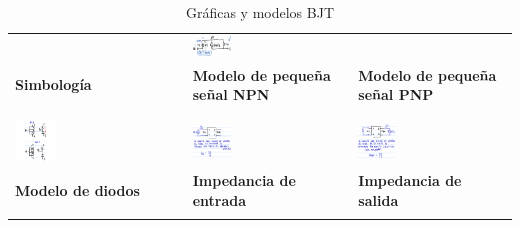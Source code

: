 \documentclass[11pt]{article}
\begin{document}
\begin{table}
\begin{tabular}{|p{}|p{}|p{}|}
		                                & \includegraphics[width=0.25\textwidth, keepaspectratio]{smallsignal-pnp}                                         \\
		\textbf{Simbología}             & \textbf{Modelo de pequeña señal NPN}                                      & \textbf{Modelo de pequeña señal PNP} \\
		                                &                                                                                                                  \\
		\hline
		                                &                                                                                                                  \\
		\includegraphics[width=0.25\textwidth, keepaspectratio]{diodes}
		                                & \includegraphics[width=0.25\textwidth, keepaspectratio]{input-impedance}
		                                & \includegraphics[width=0.25\textwidth, keepaspectratio]{output-impedance}                                        \\
		\textbf{Modelo de diodos}       & \textbf{Impedancia de entrada}                                            & \textbf{Impedancia de salida}        \\
		                                &                                                                                                                  \\
		\hline
	\end{tabular}
	\caption{Gráficas y modelos BJT}
\end{table}
\end{document}
